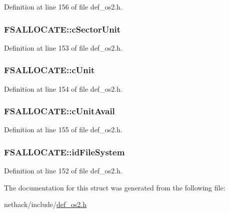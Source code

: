Definition at line 156 of file def\+\_\+os2.\+h.

\hypertarget{structFSALLOCATE_af730984fe2d62ec64a6dfcfe5b3d3973}{
\subsubsection[{c\+Sector\+Unit}]{ F\+S\+A\+L\+L\+O\+C\+A\+T\+E\+::c\+Sector\+Unit}}\label{structFSALLOCATE_af730984fe2d62ec64a6dfcfe5b3d3973}


Definition at line 153 of file def\+\_\+os2.\+h.

\hypertarget{structFSALLOCATE_a54483152185caa1454bb7c769234d472}{
\subsubsection[{c\+Unit}]{ F\+S\+A\+L\+L\+O\+C\+A\+T\+E\+::c\+Unit}}\label{structFSALLOCATE_a54483152185caa1454bb7c769234d472}


Definition at line 154 of file def\+\_\+os2.\+h.

\hypertarget{structFSALLOCATE_af5e6fd53d8768376a2f922203dfb77cd}{
\subsubsection[{c\+Unit\+Avail}]{ F\+S\+A\+L\+L\+O\+C\+A\+T\+E\+::c\+Unit\+Avail}}\label{structFSALLOCATE_af5e6fd53d8768376a2f922203dfb77cd}


Definition at line 155 of file def\+\_\+os2.\+h.

\hypertarget{structFSALLOCATE_a44c4c2a607e6e46647c9bb5ebc577cd8}{
\subsubsection[{id\+File\+System}]{ F\+S\+A\+L\+L\+O\+C\+A\+T\+E\+::id\+File\+System}}\label{structFSALLOCATE_a44c4c2a607e6e46647c9bb5ebc577cd8}


Definition at line 152 of file def\+\_\+os2.\+h.



The documentation for this struct was generated from the following file\+:\begin{DoxyCompactItemize}
\item 
nethack/include/\hyperlink{def__os2_8h}{def\+\_\+os2.\+h}\end{DoxyCompactItemize}
